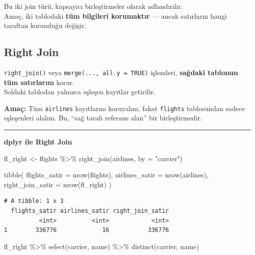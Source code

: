 \documentclass[
  letterpaper,
  DIV=11,
  numbers=noendperiod]{scrreprt}
\newenvironment{Shaded}{\begin{snugshade}}{\end{snugshade}}
\newcommand{\AttributeTok}[1]{\textcolor[rgb]{0.40,0.45,0.13}{#1}}
\newcommand{\FunctionTok}[1]{\textcolor[rgb]{0.28,0.35,0.67}{#1}}
\newcommand{\NormalTok}[1]{\textcolor[rgb]{0.00,0.23,0.31}{#1}}
\newcommand{\OtherTok}[1]{\textcolor[rgb]{0.00,0.23,0.31}{#1}}
\newcommand{\SpecialCharTok}[1]{\textcolor[rgb]{0.37,0.37,0.37}{#1}}
\newcommand{\StringTok}[1]{\textcolor[rgb]{0.13,0.47,0.30}{#1}}
\begin{document}

Bu iki join türü, kapsayıcı birleştirmeler olarak adlandırılır.\\
Amaç, iki tablodaki \textbf{tüm bilgileri korumaktır} --- ancak
satırların hangi taraftan korunduğu değişir.

\subsection*{Right Join}\label{right-join}

\texttt{right\_join()} veya \texttt{merge(...,\ all.y\ =\ TRUE)}
işlemleri, \textbf{sağdaki tablonun tüm satırlarını} korur.\\
Soldaki tablodan yalnızca eşleşen kayıtlar getirilir.

\textbf{Amaç:} Tüm \texttt{airlines} kayıtlarını koruyalım, fakat
\texttt{flights} tablosundan sadece eşleşenleri alalım. Bu, ``sağ tarafı
referans alan'' bir birleştirmedir.

\begin{center}\rule{0.5\linewidth}{0.5pt}\end{center}

\textbf{dplyr ile Right Join}

\begin{Shaded}
\begin{Highlighting}[]
\NormalTok{fl\_right }\OtherTok{\textless{}{-}}\NormalTok{ flights }\SpecialCharTok{\%\textgreater{}\%}
  \FunctionTok{right\_join}\NormalTok{(airlines, }\AttributeTok{by =} \StringTok{"carrier"}\NormalTok{)}

\FunctionTok{tibble}\NormalTok{(}
  \AttributeTok{flights\_satir =} \FunctionTok{nrow}\NormalTok{(flights),}
  \AttributeTok{airlines\_satir =} \FunctionTok{nrow}\NormalTok{(airlines),}
  \AttributeTok{right\_join\_satir =} \FunctionTok{nrow}\NormalTok{(fl\_right)}
\NormalTok{)}
\end{Highlighting}
\end{Shaded}

\begin{verbatim}
# A tibble: 1 x 3
  flights_satir airlines_satir right_join_satir
          <int>          <int>            <int>
1        336776             16           336776
\end{verbatim}

\begin{Shaded}
\begin{Highlighting}[]
\NormalTok{fl\_right }\SpecialCharTok{\%\textgreater{}\%}
\FunctionTok{select}\NormalTok{(carrier, name) }\SpecialCharTok{\%\textgreater{}\%}
\FunctionTok{distinct}\NormalTok{(carrier, name)}
\end{Highlighting}
\end{Shaded}
\end{document}
